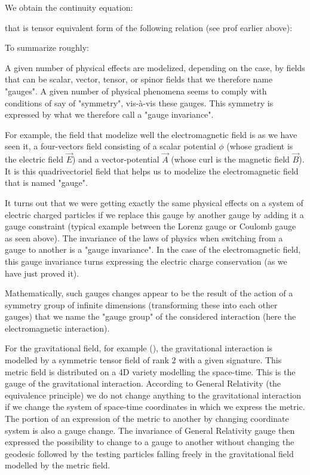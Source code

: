 	We obtain the continuity equation:
	
	that is tensor equivalent form of the following relation (see prof earlier above):
	
	To summarize roughly:
	
	A given number of physical effects are modelized, depending on the case, by fields that can be scalar, vector, tensor, or spinor fields that we therefore name "gauges". A given number of physical phenomena seems to comply with conditions of say of "symmetry", vis-à-vis these gauges. This symmetry is expressed by what we therefore call a "gauge invariance".

	For example, the field that modelize well the electromagnetic field is as we have seen it, a four-vectors field consisting of a scalar potential $\phi$ (whose gradient is the electric field $\vec{E}$) and a vector-potential $\vec{A}$ (whose curl is the magnetic field $\vec{B}$). It is this quadrivectoriel field that helps us to modelize the electromagnetic field that is named "gauge".

	It turns out that we were getting exactly the same physical effects on a system of electric charged particles if we replace this gauge by another gauge by adding it a gauge  constraint (typical example between the Lorenz gauge or Coulomb gauge as seen above). The invariance of the laws of physics when switching from a gauge to another is a "gauge invariance". In the case of the electromagnetic field, this gauge invariance turns expressing the electric charge conservation (as we have just proved it).

	Mathematically, such gauges changes appear to be the result of the action of a symmetry group of infinite dimensions (transforming these into each other gauges) that we name the "gauge group" of the considered interaction  (here the electromagnetic interaction).

	For the gravitational field, for example (), the gravitational interaction is modelled by a symmetric tensor field of rank $2$ with a given signature. This metric field is distributed on a 4D variety  modelling the space-time. This is the gauge of the gravitational interaction. According to General Relativity (the equivalence principle) we do not change anything to the gravitational interaction if we change the system of space-time coordinates in which we express the metric. The portion of an expression of the metric to another by changing coordinate system is also a gauge change. The invariance of General Relativity gauge then expressed the possibility to change to a gauge to another without changing the geodesic followed by the testing particles falling freely in the gravitational field modelled by the metric field.

